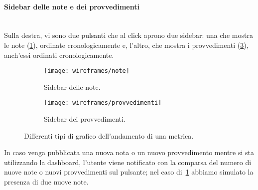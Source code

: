 \documentclass[../../../main.tex]{subfiles}
\begin{document}
\paragraph{Sidebar delle note e dei provvedimenti}\mbox{}\\
Sulla destra, vi sono due pulsanti che al click aprono due sidebar: una che mostra le note (\ref{fig:note}), ordinate cronologicamente e, l'altro, che mostra i provvedimenti (\ref{fig:provvedimenti}), anch'essi ordinati cronologicamente. 
\begin{figure}[H]
    \begin{subfigure}[b]{0.5\textwidth}
        \centering
        \texttt{[image: wireframes/note]}
        \caption{Sidebar delle note.}
        \label{fig:note}
    \end{subfigure}
\hfill
    \begin{subfigure}[b]{0.5\textwidth}
        \centering
        \texttt{[image: wireframes/provvedimenti]}
        \caption{Sidebar dei provvedimenti.}
        \label{fig:provvedimenti}
    \end{subfigure}
    \caption{Differenti tipi di grafico dell'andamento di una metrica.}
\end{figure}
In caso venga pubblicata una nuova nota o un nuovo provvedimento mentre si sta utilizzando la dashboard, l'utente viene notificato con la comparsa del numero di nuove note o nuovi provvedimenti sul pulsante; nel caso di~\ref{fig:note} abbiamo simulato la presenza di due nuove note.

\clearpage
\end{document}
